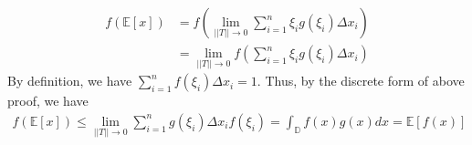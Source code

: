 \documentclass{article}
\newcommand{\E}{\mathbb{E}}
\begin{document}
\begin{enumerate}
\begin{enumerate}
        \begin{align*}
            f(\E[x]) &= f\left(\lim_{||T||\to 0}\sum_{i=1}^{n}\xi_i g(\xi_i)\Delta x_i\right)\\
            &= \lim_{||T||\to 0}f\left(\sum_{i=1}^{n}\xi_i g(\xi_i)\Delta x_i\right)
        \end{align*}
        By definition, we have $\sum_{i=1}^n f(\xi_i)\Delta x_i = 1$.
        Thus, by the discrete form of above proof, we have
        \begin{align*}
            f(\E[x])\leq \lim_{||T||\to 0} \sum_{i=1}^{n}g(\xi_i)\Delta x_i f(\xi_i) = \int_{\mathbb{D}}f(x)g(x)dx=\E[f(x)]
        \end{align*}

        
    \end{enumerate}
\end{enumerate}
\end{document}
